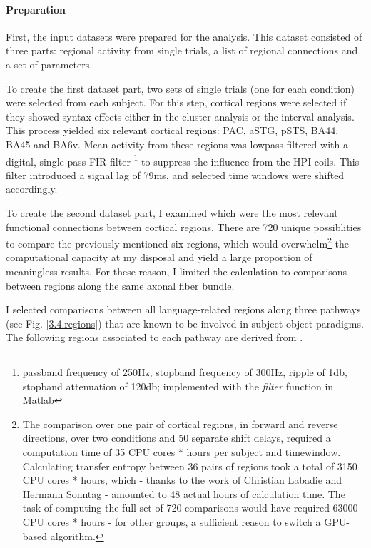 \paragraph{Preparation}
First, the input datasets were prepared for the analysis.
This dataset consisted of three parts: regional activity from single trials, a list of regional connections and a set of parameters.

To create the first dataset part, two sets of single trials (one for each condition) were selected from each subject.
For this step, cortical regions were selected if they showed syntax effects either in the cluster analysis or the interval analysis.
This process yielded six relevant cortical regions: PAC, aSTG, pSTS, BA44, BA45 and BA6v.
Mean activity from these regions was lowpass filtered with a digital, single-pass FIR filter \footnote{passband frequency of 250Hz, stopband frequency of 300Hz, ripple of 1db, stopband attenuation of 120db; implemented with the \emph{filter} function in Matlab} to suppress the influence from the HPI coils.
This filter introduced a signal lag of 79ms, and selected time windows were shifted accordingly.

To create the second dataset part, I examined which were the most relevant functional connections between cortical regions.
There are 720 unique possiblities to compare the previously mentioned six regions, which would overwhelm\footnote{The comparison over one pair of cortical regions, in forward and reverse directions, over two conditions and 50 separate shift delays, required a computation time of 35 CPU cores * hours per subject and timewindow. Calculating transfer entropy between 36 pairs of regions took a total of 3150 CPU cores * hours, which - thanks to the work of Christian Labadie and Hermann Sonntag - amounted to 48 actual hours of calculation time. The task of computing the full set of 720 comparisons would have required 63000 CPU cores * hours - for other groups, a sufficient reason to switch a GPU-based algorithm\cite{3.4.gpuTE}.} the computational capacity at my disposal and yield a large proportion of meaningless results.
For these reason, I limited the calculation to comparisons between regions along the same axonal fiber bundle.

I selected comparisons between all language-related regions along three pathways (see Fig. \ref{3.4.regions}) that are known to be involved in subject-object-paradigms.
The following regions associated to each pathway are derived from \cite{1.1.pathways}.

